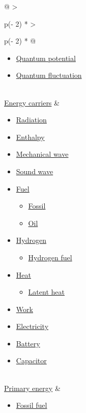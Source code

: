 \documentclass[
]{article}
\providecommand{\tightlist}{%
  \setlength{\itemsep}{0pt}\setlength{\parskip}{0pt}}
\newenvironment{LTR}{\beginL}{\endL}
\begin{document}
\begin{LTR}
\begin{otherlanguage}{english}
\begin{longtable}[]{@{}
  >{\raggedright\arraybackslash}p{(\columnwidth - 2\tabcolsep) * }
  >{\raggedright\arraybackslash}p{(\columnwidth - 2\tabcolsep) * }@{}}
\begin{minipage}[t]{\linewidth}
\begin{itemize}
  \href{/wiki/Zero-point_energy}{Zero-point energy}
\item
  \href{/wiki/Quantum_potential}{Quantum potential}
\item
  \href{/wiki/Quantum_fluctuation}{Quantum fluctuation}
\end{itemize}
\end{minipage} \\
\href{/wiki/Energy_carrier}{Energy carriers} &
\begin{minipage}[t]{\linewidth}\raggedright
\begin{itemize}
\tightlist
\item
  \href{/wiki/Radiation}{Radiation}
\item
  \href{/wiki/Enthalpy}{Enthalpy}
\item
  \href{/wiki/Mechanical_wave}{Mechanical wave}
\item
  \href{/wiki/Sound_wave}{Sound wave}
\item
  \href{/wiki/Fuel}{Fuel}

  \begin{itemize}
  \tightlist
  \item
    \href{/wiki/Fossil_fuel}{Fossil}
  \item
    \href{/wiki/Fuel_oil}{Oil}
  \end{itemize}
\item
  \href{/wiki/Hydrogen}{Hydrogen}

  \begin{itemize}
  \tightlist
  \item
    \href{/wiki/Hydrogen_fuel}{Hydrogen fuel}
  \end{itemize}
\item
  \href{/wiki/Heat}{Heat}

  \begin{itemize}
  \tightlist
  \item
    \href{/wiki/Latent_heat}{Latent heat}
  \end{itemize}
\item
  \href{/wiki/Work_(physics)}{Work}
\item
  \href{/wiki/Electricity}{Electricity}
\item
  \href{/wiki/Electric_battery}{Battery}
\item
  \href{/wiki/Capacitor}{Capacitor}
\end{itemize}
\end{minipage} \\
\href{/wiki/Primary_energy}{Primary energy} &
\begin{minipage}[t]{\linewidth}\raggedright
\begin{itemize}
\tightlist
\item
  \href{/wiki/Fossil_fuel}{Fossil fuel}


\end{itemize}
\end{minipage}
\end{longtable}
\end{otherlanguage}
\end{LTR}
\end{document}
